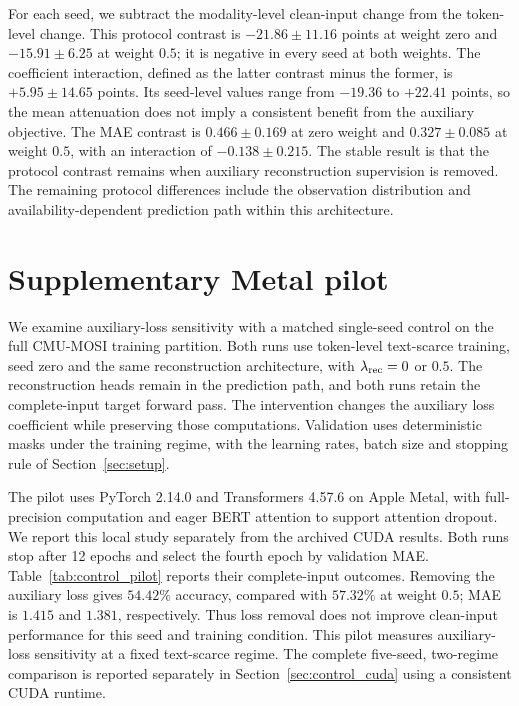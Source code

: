 \documentclass[preprint,11pt]{elsarticle}
\begin{document}
\begin{table}[!htbp]
\centering
\caption{Complete-input MAE for the same 40 CUDA runs, reported as mean
$\pm$ population standard deviation over five seeds per condition. Changes
are computed within seed; positive changes indicate greater prediction error.}
\label{tab:control_cuda_mae}
\small
\resizebox{\linewidth}{!}{}
\end{table}

For each seed, we subtract the modality-level clean-input change from the
token-level change. This protocol contrast is $-21.86\pm11.16$ points at
weight zero and $-15.91\pm6.25$ at weight $0.5$; it is negative in every
seed at both weights. The coefficient interaction, defined as the latter
contrast minus the former, is $+5.95\pm14.65$ points. Its seed-level values
range from $-19.36$ to $+22.41$ points, so the mean attenuation does not imply
a consistent benefit from the auxiliary objective. The MAE contrast is
$0.466\pm0.169$ at zero weight and $0.327\pm0.085$ at weight $0.5$,
with an interaction of $-0.138\pm0.215$.
The stable result is that the protocol contrast remains when auxiliary
reconstruction supervision is removed. The remaining protocol differences include the
observation distribution and availability-dependent prediction path within
this architecture.

\FloatBarrier
\setcounter{table}{0}
\section{Supplementary Metal pilot}\label{sec:control_pilot}

We examine auxiliary-loss sensitivity with a matched single-seed control on
the full CMU-MOSI training partition. Both runs use token-level text-scarce
training, seed zero and the same reconstruction architecture, with
$\lambda_{\rm rec}=0$ or $0.5$. The reconstruction heads remain in the
prediction path, and both runs retain the complete-input target forward pass.
The intervention changes the auxiliary loss coefficient while preserving
those computations. Validation uses deterministic masks under the training
regime, with the learning rates, batch size and stopping rule of
Section~\ref{sec:setup}.

The pilot uses PyTorch 2.14.0 and Transformers 4.57.6 on Apple Metal, with
full-precision computation and eager BERT attention to support attention
dropout. We report this local study separately from the archived CUDA results.
Both runs stop after 12 epochs and select the fourth epoch by validation MAE.
Table~\ref{tab:control_pilot} reports their complete-input outcomes. Removing
the auxiliary loss gives $54.42\%$ accuracy, compared with $57.32\%$ at weight
$0.5$; MAE is $1.415$ and $1.381$, respectively. Thus loss removal does not
improve clean-input performance for this seed and training condition.
This pilot measures auxiliary-loss sensitivity at a fixed text-scarce
regime. The complete five-seed, two-regime comparison is reported separately
in Section~\ref{sec:control_cuda} using a consistent CUDA runtime.
\end{document}
